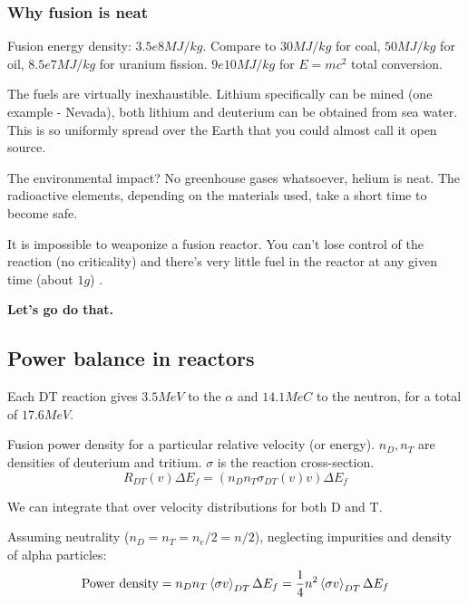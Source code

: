 \documentclass[PlasmaNotes.tex]{subfiles}
\begin{document}
\subsubsection{Why fusion is neat}

Fusion energy density: $3.5e8 MJ/kg$. Compare to $30 MJ/kg$ for coal, $50 MJ/kg$ for oil, $8.5e7 MJ/kg$ for uranium fission. $9e10 MJ/kg$ for $E=mc^2$ total conversion.

The fuels are virtually inexhaustible. Lithium specifically can be mined (one example - Nevada), both lithium and deuterium can be obtained from sea water. This is so uniformly spread over the Earth that you could almost call it open source.

The environmental impact? No greenhouse gases whatsoever, helium is neat. The radioactive elements, depending on the materials used, take a short time to become safe.

It is impossible to weaponize a fusion reactor. You can't lose control of the reaction (no criticality) and there's very little fuel in the reactor at any given time (about $1g$) .


\begin{center}
\textbf{Let's go do that.}
\end{center}

\subsection{Power balance in reactors}

Each DT reaction gives $3.5 MeV$ to the $\alpha$ and $14.1 MeC$ to the neutron, for a total of $17.6 MeV$.

Fusion power density for a particular relative velocity (or energy). $n_D, n_T$ are densities of deuterium and tritium. $\sigma$ is the reaction cross-section.
\begin{equation}
R_{DT}(v) \Delta E_f = (n_D n_T \sigma_{DT} (v) v) \Delta E_f
\end{equation}

We can integrate that over velocity distributions for both D and T.

Assuming neutrality ($n_D=n_T=n_e/2=n/2$), neglecting impurities and density of alpha particles:
\begin{equation}
\text{Power density} = n_D n_T \left< \sigma v \right>_{DT} \Delta E_f = \frac{1}{4} n^2 \left< \sigma v \right>_{DT} \Delta E_f
\end{equation}
\end{document}
